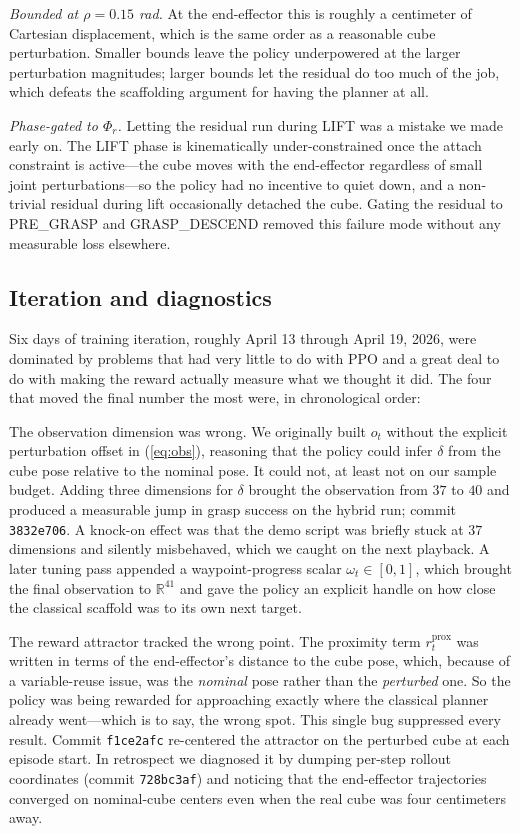 \documentclass[letterpaper, 11 pt, journal, twoside]{IEEEtran}
\newcommand{\R}{\mathbb{R}}
\def\rep#1{(\ref{#1})}
\begin{document}
\emph{Bounded at $\rho = 0.15$ rad.} At the end-effector this is roughly a centimeter of Cartesian displacement, which is the same order as a reasonable cube perturbation. Smaller bounds leave the policy underpowered at the larger perturbation magnitudes; larger bounds let the residual do too much of the job, which defeats the scaffolding argument for having the planner at all.

\emph{Phase-gated to $\Phi_r$.} Letting the residual run during LIFT was a mistake we made early on. The LIFT phase is kinematically under-constrained once the attach constraint is active---the cube moves with the end-effector regardless of small joint perturbations---so the policy had no incentive to quiet down, and a non-trivial residual during lift occasionally detached the cube. Gating the residual to PRE\_GRASP and GRASP\_DESCEND removed this failure mode without any measurable loss elsewhere.

\subsection{Iteration and diagnostics}
\label{sec:iteration}

Six days of training iteration, roughly April 13 through April 19, 2026, were dominated by problems that had very little to do with PPO and a great deal to do with making the reward actually measure what we thought it did. The four that moved the final number the most were, in chronological order:

The observation dimension was wrong. We originally built $o_t$ without the explicit perturbation offset in \rep{eq:obs}, reasoning that the policy could infer $\delta$ from the cube pose relative to the nominal pose. It could not, at least not on our sample budget. Adding three dimensions for $\delta$ brought the observation from $37$ to $40$ and produced a measurable jump in grasp success on the hybrid run; commit {\tt 3832e706}. A knock-on effect was that the demo script was briefly stuck at $37$ dimensions and silently misbehaved, which we caught on the next playback. A later tuning pass appended a waypoint-progress scalar $\omega_t \in [0,1]$, which brought the final observation to $\R^{41}$ and gave the policy an explicit handle on how close the classical scaffold was to its own next target.

The reward attractor tracked the wrong point. The proximity term $r^{\mathrm{prox}}_t$ was written in terms of the end-effector's distance to the cube pose, which, because of a variable-reuse issue, was the \emph{nominal} pose rather than the \emph{perturbed} one. So the policy was being rewarded for approaching exactly where the classical planner already went---which is to say, the wrong spot. This single bug suppressed every result. Commit {\tt f1ce2afc} re-centered the attractor on the perturbed cube at each episode start. In retrospect we diagnosed it by dumping per-step rollout coordinates (commit {\tt 728bc3af}) and noticing that the end-effector trajectories converged on nominal-cube centers even when the real cube was four centimeters away.
\end{document}
